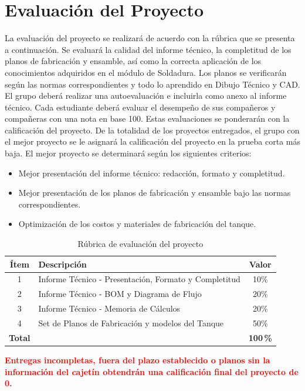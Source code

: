 \documentclass[10pt]{article}
\begin{document}
\section{Evaluación del Proyecto}
La evaluación del proyecto se realizará de acuerdo con la rúbrica que se presenta a continuación. Se evaluará la calidad del informe técnico, la completitud de los planos de fabricación y ensamble, 
así como la correcta aplicación de los conocimientos adquiridos en el módulo de Soldadura. Los planos se verificarán según las normas correspondientes y todo lo aprendido en Dibujo Técnico y CAD. 
El grupo deberá realizar una autoevaluación e incluirla como anexo al informe técnico. Cada estudiante deberá evaluar el desempeño de sus compañeros y compañeras con una nota en base 100. Estas evaluaciones 
se ponderarán con la calificación del proyecto. 
De la totalidad de los proyectos entregados, el grupo con el mejor proyecto se le asignará la calificación del proyecto en la prueba corta más baja. El mejor proyecto se determinará según
los siguientes criterios:
\begin{itemize}
    \item Mejor presentación del informe técnico: redacción, formato y completitud.
    \item Mejor presentación de los planos de fabricación y ensamble bajo las normas correspondientes.
    \item Optimización de los costos y materiales de fabricación del tanque.
\end{itemize}

\begin{table}[H]
    \centering
    \caption{Rúbrica de evaluación del proyecto}
    \label{tab:evaluacion}
    \begin{tabularx}{\textwidth}{|c|X|c|}
        \hline
        \rowcolor[HTML]{003B71}
        \color{white}\textbf{Ítem} &
        \color{white}\textbf{Descripción} &
        \color{white}\textbf{Valor} \\
        \hline
        1 & Informe Técnico - Presentación, Formato y Completitud & 10\% \\
        \hline
        2 & Informe Técnico - BOM y Diagrama de Flujo & 20\% \\
        \hline
        3 & Informe Técnico - Memoria de Cálculos & 20\% \\
        \hline
        4 & Set de Planos de Fabricación y modelos del Tanque & 50\%  \\
        \hline
        \textbf{Total} & & \textbf{100\,\%} \\
        \hline
    \end{tabularx}
\end{table}
\textcolor{red}{\textbf{Entregas incompletas, fuera del plazo establecido o planos sin la información del cajetín obtendrán una calificación final del proyecto de 0.}}
\end{document}
